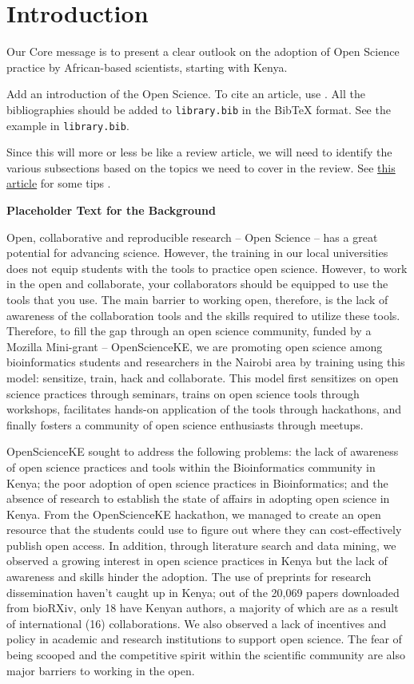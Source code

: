 \section*{Introduction}\label{introduction}

Our Core message is to present a clear outlook on the adoption of Open
Science practice by African-based scientists, starting with Kenya.

Add an introduction of the Open Science. To cite an article, use
\cite{Schlegel2016}. All the bibliographies should be added to
\texttt{library.bib} in the BibTeX format. See the example in
\texttt{library.bib}.

Since this will more or less be like a review article, we will need to
identify the various subsections based on the topics we need to cover in
the review. See
\href{http://journals.plos.org/ploscompbiol/article?id=10.1371/journal.pcbi.1005619}{this
article} for some tips \cite{Mensh2017}.

\textbf{Placeholder Text for the Background}

Open, collaborative and reproducible research -- Open Science -- has a
great potential for advancing science. However, the training in our
local universities does not equip students with the tools to practice
open science. However, to work in the open and collaborate, your
collaborators should be equipped to use the tools that you use. The main
barrier to working open, therefore, is the lack of awareness of the
collaboration tools and the skills required to utilize these tools.
Therefore, to fill the gap through an open science community, funded by
a Mozilla Mini-grant -- OpenScienceKE, we are promoting open science
among bioinformatics students and researchers in the Nairobi area by
training using this model: sensitize, train, hack and collaborate. This
model first sensitizes on open science practices through seminars,
trains on open science tools through workshops, facilitates hands-on
application of the tools through hackathons, and finally fosters a
community of open science enthusiasts through meetups.

OpenScienceKE sought to address the following problems: the lack of
awareness of open science practices and tools within the Bioinformatics
community in Kenya; the poor adoption of open science practices in
Bioinformatics; and the absence of research to establish the state of
affairs in adopting open science in Kenya. From the OpenScienceKE
hackathon, we managed to create an open resource that the students could
use to figure out where they can cost-effectively publish open access.
In addition, through literature search and data mining, we observed a
growing interest in open science practices in Kenya but the lack of
awareness and skills hinder the adoption. The use of preprints for
research dissemination haven't caught up in Kenya; out of the 20,069
papers downloaded from bioRXiv, only 18 have Kenyan authors, a majority
of which are as a result of international (16) collaborations. We also
observed a lack of incentives and policy in academic and research
institutions to support open science. The fear of being scooped and the
competitive spirit within the scientific community are also major
barriers to working in the open.

